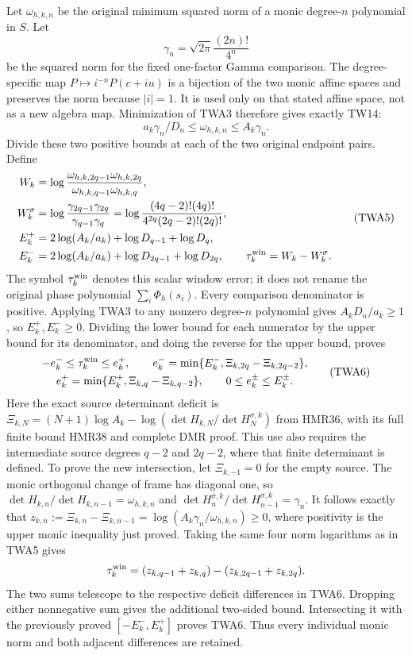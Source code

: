 Let $\omega_{h,k,n}$ be the original minimum squared norm of a monic
degree-$n$ polynomial in $S$. Let
\[
\gamma_n=\sqrt{2\pi}\frac{(2n)!}{4^n}
\]
be the squared norm for the fixed one-factor Gamma comparison.
The degree-specific map $P\mapsto i^{-n}P(c+iu)$ is a bijection of
the two monic affine spaces and preserves the norm because $|i|=1$.
It is used only on that stated affine space, not as a new algebra map.
Minimization of TWA3 therefore gives exactly TW14:
\[
a_k\gamma_n/D_n\le\omega_{h,k,n}\le A_k\gamma_n.
\]
Divide these two positive bounds at each of the two original
endpoint pairs. Define
\[
\begin{aligned}
W_k&=\log\frac{\omega_{h,k,2q-1}\omega_{h,k,2q}}
{\omega_{h,k,q-1}\omega_{h,k,q}},\\
W_k^\sigma&=\log\frac{\gamma_{2q-1}\gamma_{2q}}
{\gamma_{q-1}\gamma_q}
 =\log\frac{(4q-2)!(4q)!}{4^{2q}(2q-2)!(2q)!},\\
E_k^+&=2\log(A_k/a_k)+\log D_{q-1}+\log D_q,\\
E_k^-&=2\log(A_k/a_k)+\log D_{2q-1}+\log D_{2q},\qquad
\tau_k^{\rm win}=W_k-W_k^\sigma.
\end{aligned}\tag{TWA5}
\]
The symbol $\tau_k^{\rm win}$ denotes this scalar window error;
it does not rename the original phase polynomial $\sum_i\Phi_h(s_i)$.
Every comparison denominator is positive. Applying TWA3 to any
nonzero degree-$n$ polynomial gives $A_kD_n/a_k\ge1$, so
$E_k^+,E_k^-\ge0$. Dividing the lower bound for each numerator by
the upper bound for its denominator, and doing the reverse for the
upper bound, proves
\[
\begin{gathered}
 -e_k^-\le\tau_k^{\rm win}\le e_k^+,\qquad
 e_k^-=\min\{E_k^-,\Xi_{k,2q}-\Xi_{k,2q-2}\},\\
 e_k^+=\min\{E_k^+,\Xi_{k,q}-\Xi_{k,q-2}\},
 \qquad 0\leq e_k^\pm\leq E_k^\pm .
\end{gathered}\tag{TWA6}
\]
Here the exact source determinant deficit is
$\Xi_{k,N}=(N+1)\log A_k-
\log(\det H_{k,N}/\det H_N^{\sigma,k})$ from HMR36,
with its full finite bound HMR38 and complete DMR proof.
This use also requires the intermediate source degrees
$q-2$ and $2q-2$, where that finite determinant is defined.
To prove the new intersection, let $\Xi_{k,-1}=0$ for
the empty source. The monic orthogonal change of frame has
diagonal one, so
$\det H_{k,n}/\det H_{k,n-1}=\omega_{h,k,n}$
and
$\det H_n^{\sigma,k}/\det H_{n-1}^{\sigma,k}=\gamma_n$.
It follows exactly that
$z_{k,n}:=\Xi_{k,n}-\Xi_{k,n-1}
=\log(A_k\gamma_n/\omega_{h,k,n})\geq0$,
where positivity is the upper monic inequality just proved.
Taking the same four norm logarithms as in TWA5 gives
\[
 \tau_k^{\rm win}
 =(z_{k,q-1}+z_{k,q})-(z_{k,2q-1}+z_{k,2q}).
\]
The two sums telescope to the respective deficit differences
in TWA6. Dropping either nonnegative sum gives the additional
two-sided bound. Intersecting it with the previously proved
$[-E_k^-,E_k^+]$ proves TWA6. Thus every individual monic
norm and both adjacent differences are retained.

